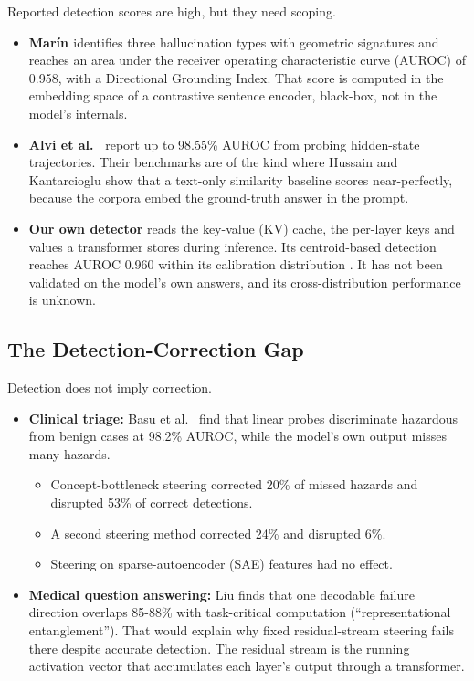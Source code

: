 \documentclass[11pt,letterpaper]{article}
\providecommand{\tightlist}{\setlength{\itemsep}{0pt}\setlength{\parskip}{0pt}}
\DeclareRobustCommand{\_}{\textunderscore\allowbreak}
\begin{document}
Reported detection scores are high, but they need scoping.

\begin{itemize}
\tightlist
\item
  \textbf{Marín \cite{marin2026geometric}} identifies three hallucination types with geometric signatures and reaches an area under the receiver operating characteristic curve (AUROC) of 0.958, with a Directional Grounding Index. That score is computed in the embedding space of a contrastive sentence encoder, black-box, not in the model's internals.
\item
  \textbf{Alvi et al.~\cite{alvi2026multihaldet}} report up to 98.55\% AUROC from probing hidden-state trajectories. Their benchmarks are of the kind where Hussain and Kantarcioglu \cite{hussain2026parallax} show that a text-only similarity baseline scores near-perfectly, because the corpora embed the ground-truth answer in the prompt.
\item
  \textbf{Our own detector} reads the key-value (KV) cache, the per-layer keys and values a transformer stores during inference. Its centroid-based detection reaches AUROC 0.960 within its calibration distribution \cite{edrington2026oracle}. It has not been validated on the model's own answers, and its cross-distribution performance is unknown.
\end{itemize}

\hypertarget{the-detection-correction-gap}{%
\subsection{The Detection-Correction Gap}\label{the-detection-correction-gap}}

Detection does not imply correction.

\begin{itemize}
\tightlist
\item
  \textbf{Clinical triage:} Basu et al.~\cite{basu2026interpretability} find that linear probes discriminate hazardous from benign cases at 98.2\% AUROC, while the model's own output misses many hazards.

  \begin{itemize}
  \tightlist
  \item
    Concept-bottleneck steering corrected 20\% of missed hazards and disrupted 53\% of correct detections.
  \item
    A second steering method corrected 24\% and disrupted 6\%.
  \item
    Steering on sparse-autoencoder (SAE) features had no effect.
  \end{itemize}
\item
  \textbf{Medical question answering:} Liu \cite{liu2026decodable} finds that one decodable failure direction overlaps 85-88\% with task-critical computation (``representational entanglement''). That would explain why fixed residual-stream steering fails there despite accurate detection. The residual stream is the running activation vector that accumulates each layer's output through a transformer.
\end{itemize}
\end{document}
